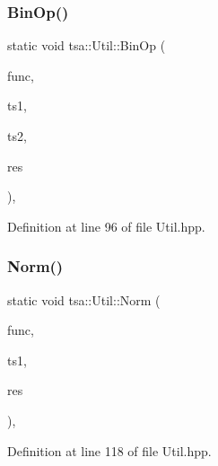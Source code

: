 \subsubsection{\texorpdfstring{Bin\+Op()}{BinOp()}}
{\footnotesize\ttfamily static void tsa\+::\+Util\+::\+Bin\+Op (\begin{DoxyParamCaption}\item[{double($\ast$)(double, double)}]{func,  }\item[{\hyperlink{namespacetsa_ac599574bcc094eda25613724b8f3ca9e}{Seq\+View\+Double} \&}]{ts1,  }\item[{\hyperlink{namespacetsa_ac599574bcc094eda25613724b8f3ca9e}{Seq\+View\+Double} \&}]{ts2,  }\item[{\hyperlink{namespacetsa_ac599574bcc094eda25613724b8f3ca9e}{Seq\+View\+Double} \&}]{res }\end{DoxyParamCaption})\hspace{0.3cm}{\ttfamily [inline]}, {\ttfamily [static]}}



Definition at line 96 of file Util.\+hpp.

\mbox{\label{classtsa_1_1_util_ad39a3bcca5699dfa0a9672f764f97805}} 
\subsubsection{\texorpdfstring{Norm()}{Norm()}}
{\footnotesize\ttfamily static void tsa\+::\+Util\+::\+Norm (\begin{DoxyParamCaption}\item[{double($\ast$)(double)}]{func,  }\item[{\hyperlink{namespacetsa_ac599574bcc094eda25613724b8f3ca9e}{Seq\+View\+Double} \&}]{ts1,  }\item[{\hyperlink{namespacetsa_ac599574bcc094eda25613724b8f3ca9e}{Seq\+View\+Double} \&}]{res }\end{DoxyParamCaption})\hspace{0.3cm}{\ttfamily [inline]}, {\ttfamily [static]}}



Definition at line 118 of file Util.\+hpp.

\mbox{\label{classtsa_1_1_util_adf9b21b326aec4a49d09083d35eaca91}} 

